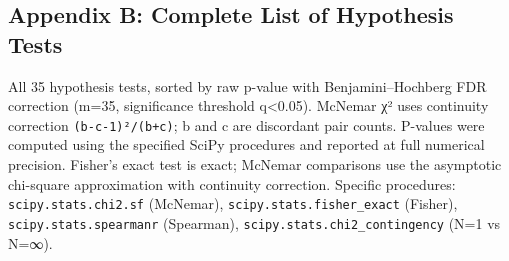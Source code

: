 \subsection{Appendix B: Complete List of Hypothesis Tests}\label{appendix-b-complete-list-of-hypothesis-tests}



All 35 hypothesis tests, sorted by raw p-value with Benjamini--Hochberg FDR correction (m=35, significance threshold q\textless0.05). McNemar χ² uses continuity correction \texttt{(\textbar{}b-c\textbar{}-1)²/(b+c)}; b and c are discordant pair counts. P-values were computed using the specified SciPy procedures and reported at full numerical precision. Fisher's exact test is exact; McNemar comparisons use the asymptotic chi-square approximation with continuity correction. Specific procedures: \texttt{scipy.stats.chi2.sf} (McNemar), \texttt{scipy.stats.fisher\_exact} (Fisher), \texttt{scipy.stats.spearmanr} (Spearman), \texttt{scipy.stats.chi2\_contingency} (N=1 vs N=∞).



